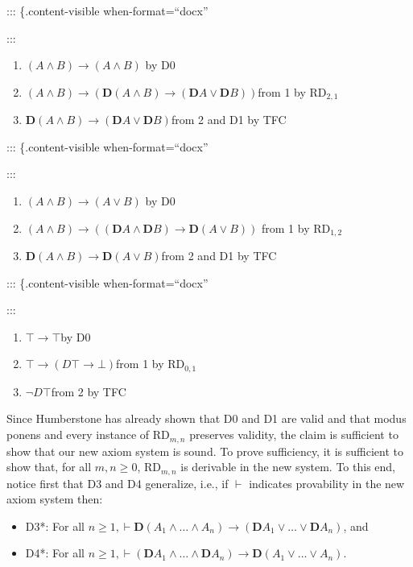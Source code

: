 \documentclass[
  10pt,
  letterpaper,
  DIV=11,
  numbers=noendperiod,
  twoside]{scrartcl}
\providecommand{\tightlist}{%
  \setlength{\itemsep}{0pt}\setlength{\parskip}{0pt}}\usepackage{longtable,booktabs,array}
\begin{document}
::: \{.content-visible when-format=``docx''

:::

\begin{enumerate}
\def\labelenumi{\arabic{enumi}.}
\tightlist
\item
  \((A\wedge B)\rightarrow (A\wedge B)\) by D0
\item
  \((A\wedge B)\rightarrow (\mathbf{D}(A\wedge B)\rightarrow (\mathbf{D}A\vee \mathbf{D}B))\)from
  1 by RD\(_{2,1}\)
\item
  \(\mathbf{D}(A\wedge B)\rightarrow (\mathbf{D}A\vee \mathbf{D}B)\)from
  2 and D1 by TFC
\end{enumerate}

::: \{.content-visible when-format=``docx''

:::

\begin{enumerate}
\def\labelenumi{\arabic{enumi}.}
\tightlist
\item
  \((A\wedge B)\rightarrow (A\vee B)\) by D0
\item
  \((A\wedge B)\rightarrow ((\mathbf{D}A\wedge \mathbf{D}B)\rightarrow \mathbf{D}(A\vee B))\)
  from 1 by RD\(_{1,2}\)
\item
  \(\mathbf{D}(A\wedge B)\rightarrow \mathbf{D}(A\vee B)\)from 2 and D1
  by TFC
\end{enumerate}

::: \{.content-visible when-format=``docx''

:::

\begin{enumerate}
\def\labelenumi{\arabic{enumi}.}
\tightlist
\item
  \(\top \rightarrow \top\)by D0
\item
  \(\top \rightarrow (D\top \rightarrow \bot)\)from 1 by RD\(_{0,1}\)
\item
  \(\neg D\top\)from 2 by TFC
\end{enumerate}

Since Humberstone has already shown that D0 and D1 are valid and that
modus ponens and every instance of RD\(_{m,n}\) preserves validity, the
claim is sufficient to show that our new axiom system is sound. To prove
sufficiency, it is sufficient to show that, for all \(m,n\!\ge\!0\),
RD\(_{m,n}\) is derivable in the new system. To this end, notice first
that D3 and D4 generalize, i.e., if \(\vdash\) indicates provability in
the new axiom system then:

\begin{itemize}
\tightlist
\item
  D3*: For all
  \(n{\ge}1, \vdash \mathbf{D}(A_1\wedge {\ldots}\wedge A_n) \rightarrow (\mathbf{D}A_1\vee {\ldots}\vee \mathbf{D}A_n)\),
  and
\item
  D4*: For all
  \(n{\ge}1, \vdash (\mathbf{D}A_1\wedge {\ldots}\wedge \mathbf{D}A_n) \rightarrow \mathbf{D}(A_1\vee {\ldots}\vee A_n)\).
\end{itemize}
\end{document}
